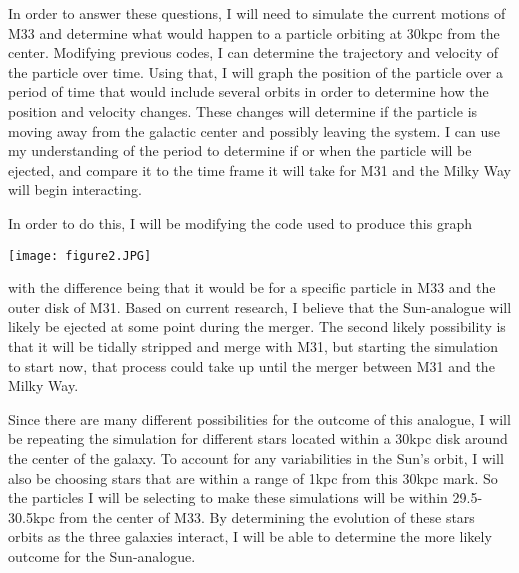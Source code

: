 \documentclass{aastex63}
\begin{document}
In order to answer these questions, I will need to simulate the current motions of M33 and determine what would happen to a particle orbiting at 30kpc from the center. Modifying previous codes, I can determine the trajectory and velocity of the particle over time. Using that, I will graph the position of the particle over a period of time that would include several orbits in order to determine how the position and velocity changes. These changes will determine if the particle is moving away from the galactic center and possibly leaving the system. I can use my understanding of the period to determine if or when the particle will be ejected, and compare it to the time frame it will take for M31 and the Milky Way will begin interacting.

In order to do this, I will be modifying the code used to produce this graph 

\texttt{[image: figure2.JPG]}

with the difference being that it would be for a specific particle in M33 and the outer disk of M31. Based on current research, I believe that the Sun-analogue will likely be ejected at some point during the merger. The second likely possibility is that it will be tidally stripped and merge with M31, but starting the simulation to start now, that process could take up until the merger between M31 and the Milky Way.

Since there are many different possibilities for the outcome of this analogue, I will be repeating the simulation for different stars located within a 30kpc disk around the center of the galaxy. To account for any variabilities in the Sun's orbit, I will also be choosing stars that are within a range of 1kpc from this 30kpc mark. So the particles I will be selecting to make these simulations will be within 29.5-30.5kpc from the center of M33. By determining the evolution of these stars orbits as the three galaxies interact, I will be able to determine the more likely outcome for the Sun-analogue.


{}

\end{document}
